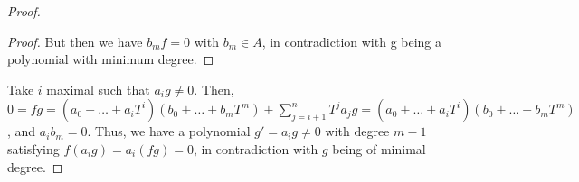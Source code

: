 \begin{problem}
\begin{enumerate}[label=(\theproblem.\arabic*),ref=\theproblem.\arabic*]
\begin{sol}
\begin{proof}
\begin{claim}
\begin{proof}
                            But then we have $b_m f = 0$ with $b_m \in A$, in contradiction with g being a polynomial with minimum degree.
                        \end{proof}
                    \end{claim}
                    Take $i$ maximal such that $a_i g \neq 0$.
                    Then, $0 = f g = (a_0 + \dots + a_i T^i) (b_0 + \dots + b_m T^m) + \sum_{j=i+1}^n T^j a_j g = (a_0 + \dots + a_i T^i) (b_0 + \dots + b_m T^m)$, and $a_i b_m = 0$.
                    Thus, we have a polynomial $g' = a_i g \neq 0$ with degree $m-1$ satisfying $f (a_i g) = a_i (f g) = 0$, in contradiction with $g$ being of minimal degree.
                \end{proof}
            \end{sol}
    \end{enumerate}
\end{problem}

